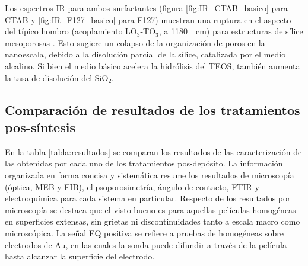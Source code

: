 		 Los espectros IR para ambos surfactantes (figura \ref{fig:IR_CTAB_basico} para CTAB y \ref{fig:IR_F127_basico} para F127) muestran una ruptura en el aspecto del típico hombro (acoplamiento LO$_3$-TO$_3$, a \SI{1180}{\per\cm}) para estructuras de sílice mesoporosas \cite{Olsen1989,Innocenzi2003,Angelome2008}. Esto sugiere un colapso de la organización de poros en la nanoescala, debido a la disolución parcial de la sílice, catalizada por el medio alcalino. Si bien el medio básico acelera la hidrólisis del TEOS, también aumenta la tasa de disolución del SiO$_2$.\cite{Mazer1994,Niibori2000,Gorrepati2010}

	 \subsection{Comparación de resultados de los tratamientos pos-síntesis}
	 		
	 		En la tabla \ref{tabla:resultados} se comparan los resultados de las caracterización de las \pdm\space obtenidas por cada uno de los tratamientos pos-depósito. La información organizada en forma concisa y sistemática resume los resultados de microscopía (óptica, MEB y FIB), elipsoporosimetría, ángulo de contacto, FTIR y electroquímica para cada sistema en particular. Respecto de los resultados por microscopía se destaca que el visto bueno es para aquellas películas homogéneas en superficies extensas, sin grietas ni discontinuidades tanto a escala macro como microscópica. La señal EQ positiva se refiere a pruebas de \pdm\space homogéneas sobre electrodos de Au, en las cuales la sonda puede difundir a través de la película hasta alcanzar la superficie del electrodo.

